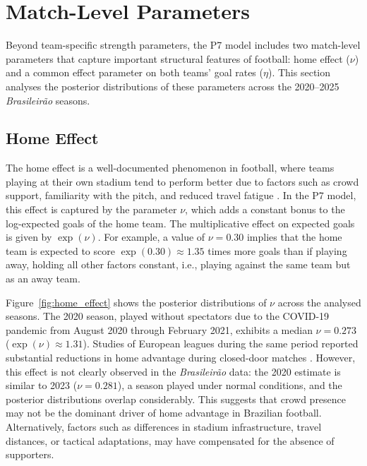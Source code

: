 \section{Match-Level Parameters}
\label{sec:match_level_parameters}

Beyond team-specific strength parameters, the P7 model includes two match-level parameters that capture important structural features of football: home effect ($\nu$) and a common effect parameter on both teams' goal rates ($\eta$).
This section analyses the posterior distributions of these parameters across the 2020--2025 \textit{Brasileirão} seasons.

\subsection{Home Effect}
\label{subsec:home_effect}

The home effect is a well-documented phenomenon in football, where teams playing at their own stadium tend to perform better due to factors such as crowd support, familiarity with the pitch, and reduced travel fatigue \cite{pollard_1986}.
In the P7 model, this effect is captured by the parameter $\nu$, which adds a constant bonus to the log-expected goals of the home team.
The multiplicative effect on expected goals is given by $\exp(\nu)$.
For example, a value of $\nu = 0.30$ implies that the home team is expected to score $\exp(0.30) \approx 1.35$ times more goals than if playing away, holding all other factors constant, i.e., playing against the same team but as an away team.

Figure~\ref{fig:home_effect} shows the posterior distributions of $\nu$ across the analysed seasons.
The 2020 season, played without spectators due to the COVID-19 pandemic from August 2020 through February 2021, exhibits a median $\nu = 0.273$ ($\exp(\nu) \approx 1.31$).
Studies of European leagues during the same period reported substantial reductions in home advantage during closed-door matches \cite{fischer_2021, sors_2021, benz_2023}.
However, this effect is not clearly observed in the \textit{Brasileirão} data: the 2020 estimate is similar to 2023 ($\nu = 0.281$), a season played under normal conditions, and the posterior distributions overlap considerably.
This suggests that crowd presence may not be the dominant driver of home advantage in Brazilian football.
Alternatively, factors such as differences in stadium infrastructure, travel distances, or tactical adaptations, may have compensated for the absence of supporters.

